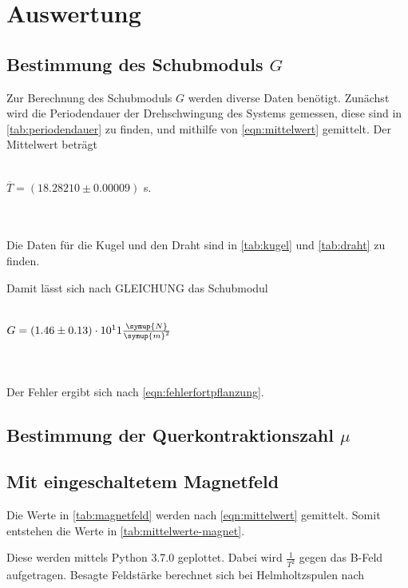 \section{Auswertung}
\label{sec:Auswertung}
\subsection{Bestimmung des Schubmoduls $G$}

Zur Berechnung des Schubmoduls $G$ werden diverse Daten benötigt. Zunächst wird die Periodendauer der Drehschwingung des Systems gemessen, diese sind in \autoref{tab:periodendauer} zu finden, und mithilfe von \eqref{eqn:mittelwert} gemittelt. Der Mittelwert beträgt
\\ \\
\centerline{$\overline{T} = (18.28210 \pm 0.00009)$ s.}
\\ \\
Die Daten für die Kugel und den Draht sind in \autoref{tab:kugel} und \autoref{tab:draht} zu finden.




Damit lässt sich nach GLEICHUNG das Schubmodul
\\ \\
\centerline{$G = (1.46 \pm 0.13) \cdot 10^11 \frac{\symup{N}}{\symup{m}^2}$}
\\ \\
Der Fehler ergibt sich nach \eqref{eqn:fehlerfortpflanzung}.

\subsection{Bestimmung der Querkontraktionszahl $\mu$}



\subsection{Mit eingeschaltetem Magnetfeld}


Die Werte in \autoref{tab:magnetfeld} werden nach \eqref{eqn:mittelwert} gemittelt. Somit entstehen die Werte in \autoref{tab:mittelwerte-magnet}.



Diese werden mittels Python 3.7.0 geplottet. Dabei wird $\frac{1}{T^2}$ gegen das B-Feld aufgetragen. Besagte Feldstärke berechnet sich bei Helmholtzspulen nach


